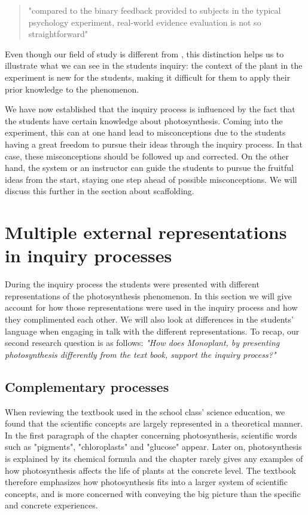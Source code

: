 \begin{quote}"compared to the binary feedback provided to subjects in the typical psychology experiment, real-world evidence evaluation is not so straightforward" \citetext{\citet[p. 114]{klahr1993heuristics}, referenced in \citealp{de1998scientific}}
\end{quote}

Even though our field of study is different from \citeauthor{klahr1993heuristics}, this distinction helps us to illustrate what we can see in the students inquiry: the context of the plant in the experiment is new for the students, making it difficult for them to apply their prior knowledge to the phenomenon. 

We have now established that the inquiry process is influenced by the fact that the students have certain knowledge about photosynthesis. Coming into the experiment, this can at one hand lead to misconceptions due to the students having a great freedom to pursue their ideas through the inquiry process. In that case, these misconceptions should be followed up and corrected. On the other hand, the system or an instructor can guide the students to pursue the fruitful ideas from the start, staying one step ahead of possible misconceptions. We will discuss this further in the section about scaffolding.



\section{Multiple external representations in inquiry processes}
During the inquiry process the students were presented with different representations of the photosynthesis phenomenon. In this section we will give account for how those representations were used in the inquiry process and how they complimented each other. We will also look at differences in the students' language when engaging in talk with the different representations. To recap, our second research question is as follows: \emph{"How does Monoplant, by presenting photosynthesis differently from the text book, support the inquiry process?"}

\subsection{Complementary processes}
When reviewing the textbook used in the school class' science education, we found that the scientific concepts are largely represented in a theoretical manner. In the first paragraph of the chapter concerning photosynthesis, scientific words such as "pigments", "chloroplasts" and "glucose" appear. Later on, photosynthesis is explained by its chemical formula and the chapter rarely gives any examples of how photosynthesis affects the life of plants at the concrete level. The textbook therefore emphasizes how photosynthesis fits into a larger system of scientific concepts, and is more concerned with conveying the big picture than the specific and concrete experiences. 

